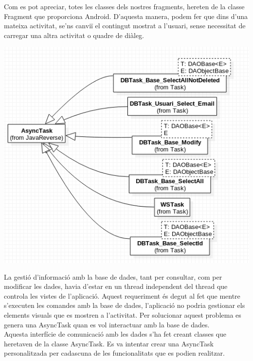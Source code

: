 \documentclass{article}[]
\begin{document}
	Com es pot apreciar, totes les classes dels nostres fragments, hereten de la classe Fragment que proporciona Android. D'aquesta manera, podem fer que dins d'una mateixa activitat, se'ns canviï el contingut mostrat a l'usuari, sense necessitat de carregar una altra activitat o quadre de diàleg.\\
\begin{center}
	\includegraphics[scale=0.5]{img/5.png}
	\end{center}
	La gestió d'informació amb la base de dades, tant per consultar, com per modificar les dades, havia d'estar en un thread independent del thread que controla les vistes de l'aplicació. Aquest requeriment és degut al fet que mentre s'executen les comandes amb la base de dades, l'aplicació no podria gestionar els elements visuals que es mostren a l'activitat. Per solucionar aquest problema es genera una AsyncTask quan es vol interactuar amb la base de dades.\\

Aquesta interfície de comunicació amb les dades s'ha fet creant classes que heretaven de la classe AsyncTask. Es va intentar crear una AsyncTask personalitzada per cadascuna de les funcionalitats que es podien realitzar.\\
\end{document}
